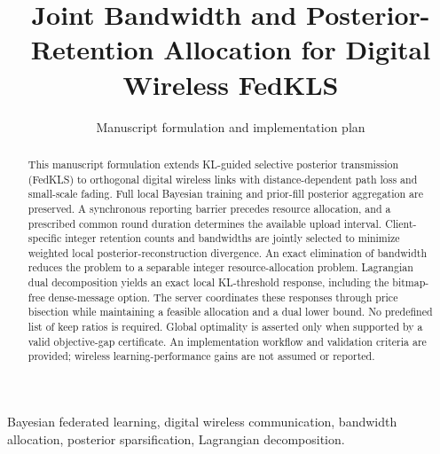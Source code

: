 \documentclass[journal]{IEEEtran}
\begin{document}
\title{Joint Bandwidth and Posterior-Retention Allocation for Digital Wireless FedKLS}
\author{Manuscript formulation and implementation plan}
\maketitle
\begin{abstract}
This manuscript formulation extends KL-guided selective posterior transmission (FedKLS) to orthogonal digital wireless links with distance-dependent path loss and small-scale fading. Full local Bayesian training and prior-fill posterior aggregation are preserved. A synchronous reporting barrier precedes resource allocation, and a prescribed common round duration determines the available upload interval. Client-specific integer retention counts and bandwidths are jointly selected to minimize weighted local posterior-reconstruction divergence. An exact elimination of bandwidth reduces the problem to a separable integer resource-allocation problem. Lagrangian dual decomposition yields an exact local KL-threshold response, including the bitmap-free dense-message option. The server coordinates these responses through price bisection while maintaining a feasible allocation and a dual lower bound. No predefined list of keep ratios is required. Global optimality is asserted only when supported by a valid objective-gap certificate. An implementation workflow and validation criteria are provided; wireless learning-performance gains are not assumed or reported.
\end{abstract}
\begin{IEEEkeywords}
Bayesian federated learning, digital wireless communication, bandwidth allocation, posterior sparsification, Lagrangian decomposition.
\end{IEEEkeywords}





\end{document}
